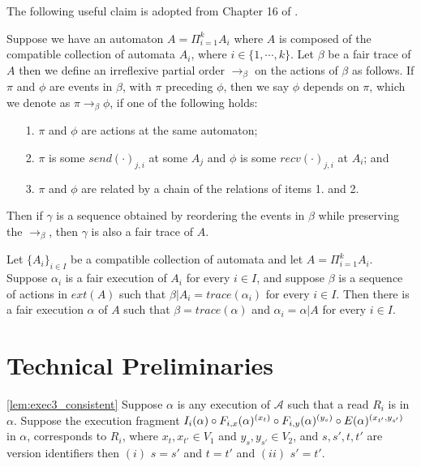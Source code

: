 The following useful  claim is adopted from  Chapter 16 of \cite{Lynch1996}.
\begin{claim}\label{claim:reorder}
	Suppose we have an automaton $A = \Pi_{i=1}^k A_i$ where $A$ is composed of the compatible collection of automata $A_i$, where $i \in \{1, \cdots, k\}$.
	Let $\beta$ be a fair trace of $A$ then we define an irreflexive partial order $\rightarrow_{\beta}$ on the actions of $\beta$
	as follows. If $\pi$ and $\phi$ are events in $\beta$, with $\pi$ preceding $\phi$, then we say $\phi$ depends on $\pi$, which we denote as $\pi \rightarrow_{\beta}\phi$, if one of the following holds:  
	\begin{enumerate}
		\item[1.] $\pi$ and $\phi$ are actions at the same automaton;
		\item[2.] $\pi$ is some $send(\cdot)_{j, i}$ at some $A_j$ and $\phi$ is some $recv(\cdot)_{j,i}$ at $A_i$; and
		\item[3.] $\pi$ and $\phi$ are related by a chain of the relations of items 1. and 2.
	\end{enumerate}
	Then if $\gamma$ is a sequence obtained by reordering the events in $\beta$ while preserving the $\rightarrow_{\beta}$, then $\gamma$ is also a fair trace of $A$.
\end{claim}
\begin{theorem} \label{thm:fairtrace}
	Let $\{A_i\}_{i \in I}$ be a compatible collection of automata and let $A = \Pi_{i=1}^k A_i$. Suppose $\alpha_i$ is a fair
	execution of $A_i$ for every $i \in I$, and suppose $\beta$ is a sequence of actions  in $ext(A)$ such that $\beta|A_i=trace(\alpha_i)$
	for every $i \in I$. Then there is a fair execution $\alpha$ of $A$ such that $\beta=trace(\alpha)$ and $\alpha_i = \alpha|A$ for 
	every $i\in I$.
\end{theorem}


\section{Technical Preliminaries}
\label{app:lem_exec3_consistent}
\begin{lemma*}\ref{lem:exec3_consistent} 
Suppose $\alpha$ is any execution of $\mathcal{A}$ such that a {\sc read} $R_i$ is in $\alpha$. Suppose the  execution fragment $\frage{I_i}{\alpha}{} \circ \frage{F_{i, x}}{\alpha}{x_{t}} \circ \frage{F_{i,y}}{\alpha}{y_{s}} \circ \frage{E}{\alpha}{x_{t'}, y_{s'}}$ in $\alpha$,  corresponds to $R_i$,  where   $x_t, x_{t'} \in V_1$ and  $y_s, y_{s'} \in V_2$, and $s, s', t, t' $ are version identifiers  then $(i)$ $s = s'$  and $ t=t'$ and $(ii)$ $s'=t'$.  
\end{lemma*}


